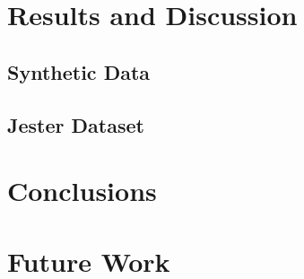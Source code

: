 \documentclass{article} %
\begin{document}
\section{Results and Discussion}
\subsection{Synthetic Data}



\subsection{Jester Dataset}

\section{Conclusions}

\section{Future Work}




\end{document}
